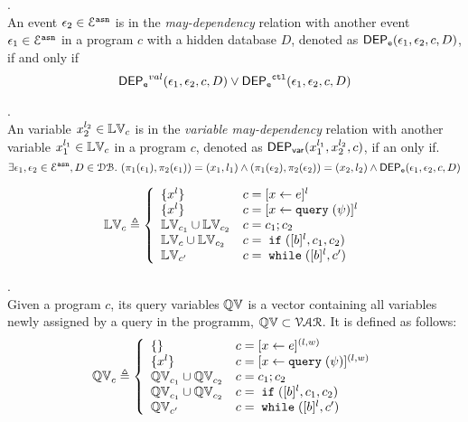 %
\begin{defn}.
\label{def:event_dep}
\\ 
An event $\mathtt{\epsilon}_2 \in \mathcal{E}^{\mathtt{{asn}}}$ is in the \emph{may-dependency} relation with another
event $\mathtt{\epsilon}_1 \in \mathcal{E}^{\mathtt{{asn}}}$ in a program ${c}$ with a hidden database $D$, denoted as $\mathsf{DEP_{\mathtt{e}}}(\mathtt{\epsilon}_1, \mathtt{\epsilon}_2, c, D)$,
if and only if
\[
\mathsf{DEP_{\mathtt{e}}}^{val}(\mathtt{\epsilon}_1, \mathtt{\epsilon}_2, c, D) 
\lor
\mathsf{DEP_{\mathtt{e}}}^{\mathtt{{ctl}}}(\mathtt{\epsilon}_1, \mathtt{\epsilon}_2, c, D) 
\] %
%
\end{defn}
%
\begin{defn}.
\label{def:var_dep}
\\
An variable ${x}_2^{l_2} \in \mathbb{LV}_{{c}}$ is in the \emph{variable may-dependency} relation with another
variable ${x}_1^{l_1} \in \mathbb{LV}_{{c}}$ in a program ${c}$, denoted as 
%
$\mathsf{DEP_{var}}({x}_1^{l_1}, {x}_2^{l_2}, {c})$, if an only if.
%
\[
\exists \mathtt{\epsilon}_1, \mathtt{\epsilon}_2 \in \mathcal{E}^{\mathtt{{asn}}}, D \in \mathcal{DB}. ~
(\pi_{1}{(\mathtt{\epsilon}_1)}, \pi_{2}{(\mathtt{\epsilon}_1)}) = ({x}_1, l_1)
\land
(\pi_{1}{(\mathtt{\epsilon}_2)}, \pi_{2}{(\mathtt{\epsilon}_2)}) = ({x}_2, l_2)
\land 
\mathsf{DEP_{\mathtt{e}}}(\mathtt{\epsilon}_1, \mathtt{\epsilon}_2, c, D)
\] 
%
%
\end{defn}
%
\begin{defn}
$$
  \lvar_{c} \triangleq
  \left\{
  \begin{array}{ll}
      \{{x}^l\}                   
      & {c} = [{\assign x e}]^{l} 
      \\
      \{{x}^l\}                   
      & {c} = [{\assign x \query(\qexpr)}]^{l} 
      \\
      \lvar_{{c_1}} \cup \lvar_{{c_2}}  
      & {c} = {c_1};{c_2}
      \\
      \lvar_{{c}} \cup \lvar_{{c_2}} 
      & {c} =\eif([\bexpr]^{l}, c_1, c_2) 
      \\
      \lvar_{{c}'}
      & {c}   = \ewhile ([\bexpr]^{l}, {c}')
\end{array}
\right.
$$
\end{defn}
%
\begin{defn}.
\\
Given a program $c$, its query variables $\mathbb{QV}$ is a vector containing all variables newly assigned by a query in the programm, $\mathbb{QV} \subset \mathcal{VAR}$.
It is defined as follows:
$$
  \qvar_{{c}} \triangleq
  \left\{
  \begin{array}{ll}
      \{\}                  
      & {c} = [{\assign x e}]^{(l, w)} 
      \\
      \{{x}^l\}                  
      & {c} = [{\assign x \query(\qexpr)}]^{(l, w)} 
      \\
      \qvar_{{c_1}} \cup \qvar_{{c_2}}  
      & {c} = {c_1};{c_2}
      \\
      \qvar_{{c_1}} \cup \qvar_{{c_2}} 
      & {c} =\eif([\bexpr]^{l}, c_1, c_2) 
      \\
      \qvar_{{c}'}
      & {c}   = \ewhile ([\bexpr]^{l}, {c}')
\end{array}
\right.
$$
\end{defn}
